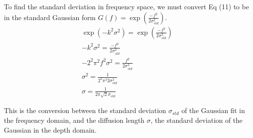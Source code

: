 \documentclass[draft, jgrga]{AGUTeX}
\begin{document}
\begin{article}
To find the standard deviation in frequency space, we must convert Eq (11) to be in the standard Gaussian form $G(f) = \exp\left(\frac{-f^{2}}{2\sigma_{std}^{2}}\right)$.
\begin{eqnarray}
  \exp\left(-k^{2}\sigma^{2}\right) = \exp\left(\frac{-f^{2}}{2\sigma_{std}^{2}}\right)\\
  -k^{2}\sigma^{2} = \frac{-f^{2}}{2\sigma_{std}^{2}}\\
  -2^{2}\pi^{2}f^{2}\sigma^{2} = \frac{f^{2}}{2\sigma_{std}^{2}} \\
  \sigma^{2} = \frac{1}{2^{2}\pi^{2}2\sigma_{std}^{2}} \\
  \sigma = \frac{1}{2\pi\sqrt{2}\sigma_{std}}
\end{eqnarray}

This is the conversion between the standard deviation $\sigma_{std}$ of the Gaussian fit in the frequency domain,  and the diffusion length $\sigma$, the standard deviation of the Gaussian in the depth domain.









\end{article}
\end{document}
